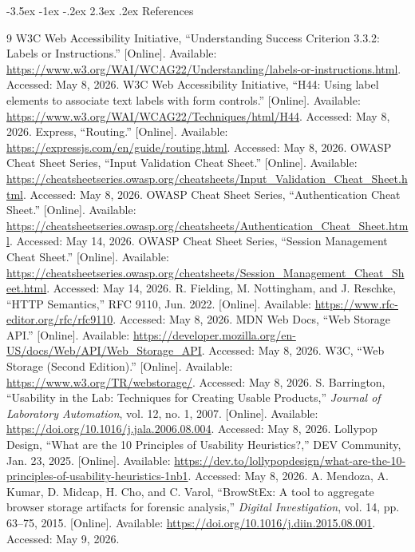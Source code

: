 \documentclass[12pt,a4paper]{article}
\makeatletter
\renewcommand\section{\@startsection{section}{1}{\z@}%
  {-3.5ex \@plus -1ex \@minus -.2ex}%
  {2.3ex \@plus .2ex}%
  {\normalfont\bfseries\fontsize{14}{16}\selectfont}}
\makeatother
\begin{document}
\section{References}
\renewcommand{\refname}{}
\vspace{-2em}
\begin{thebibliography}{9}
 W3C Web Accessibility Initiative, ``Understanding Success Criterion 3.3.2: Labels or Instructions.'' [Online]. Available: \url{https://www.w3.org/WAI/WCAG22/Understanding/labels-or-instructions.html}. Accessed: May 8, 2026.
 W3C Web Accessibility Initiative, ``H44: Using label elements to associate text labels with form controls.'' [Online]. Available: \url{https://www.w3.org/WAI/WCAG22/Techniques/html/H44}. Accessed: May 8, 2026.
 Express, ``Routing.'' [Online]. Available: \url{https://expressjs.com/en/guide/routing.html}. Accessed: May 8, 2026.
 OWASP Cheat Sheet Series, ``Input Validation Cheat Sheet.'' [Online]. Available: \url{https://cheatsheetseries.owasp.org/cheatsheets/Input_Validation_Cheat_Sheet.html}. Accessed: May 8, 2026.
 OWASP Cheat Sheet Series, ``Authentication Cheat Sheet.'' [Online]. Available: \url{https://cheatsheetseries.owasp.org/cheatsheets/Authentication_Cheat_Sheet.html}. Accessed: May 14, 2026.
 OWASP Cheat Sheet Series, ``Session Management Cheat Sheet.'' [Online]. Available: \url{https://cheatsheetseries.owasp.org/cheatsheets/Session_Management_Cheat_Sheet.html}. Accessed: May 14, 2026.
 R. Fielding, M. Nottingham, and J. Reschke, ``HTTP Semantics,'' RFC 9110, Jun. 2022. [Online]. Available: \url{https://www.rfc-editor.org/rfc/rfc9110}. Accessed: May 8, 2026.
 MDN Web Docs, ``Web Storage API.'' [Online]. Available: \url{https://developer.mozilla.org/en-US/docs/Web/API/Web_Storage_API}. Accessed: May 8, 2026.
 W3C, ``Web Storage (Second Edition).'' [Online]. Available: \url{https://www.w3.org/TR/webstorage/}. Accessed: May 8, 2026.
 S. Barrington, ``Usability in the Lab: Techniques for Creating Usable Products,'' \textit{Journal of Laboratory Automation}, vol. 12, no. 1, 2007. [Online]. Available: \url{https://doi.org/10.1016/j.jala.2006.08.004}. Accessed: May 8, 2026.
 Lollypop Design, ``What are the 10 Principles of Usability Heuristics?,'' DEV Community, Jan. 23, 2025. [Online]. Available: \url{https://dev.to/lollypopdesign/what-are-the-10-principles-of-usability-heuristics-1nb1}. Accessed: May 8, 2026.
 A. Mendoza, A. Kumar, D. Midcap, H. Cho, and C. Varol, ``BrowStEx: A tool to aggregate browser storage artifacts for forensic analysis,'' \textit{Digital Investigation}, vol. 14, pp. 63--75, 2015. [Online]. Available: \url{https://doi.org/10.1016/j.diin.2015.08.001}. Accessed: May 9, 2026.
\end{thebibliography}
\end{document}
